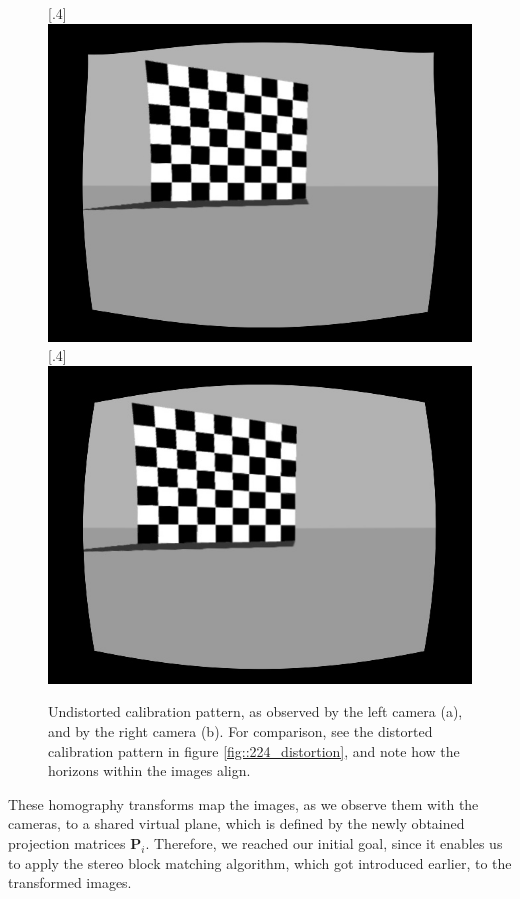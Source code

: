 \begin{figure}[h!]
	\centering
	\captionbox{}%
	[.4\linewidth]{\includegraphics[scale=.2]{chapters/03_principles_of_machine_learning/img/gazebo_rectified_left.jpg}}
	\captionbox{}%
	[.4\linewidth]{\includegraphics[scale=.2]{chapters/03_principles_of_machine_learning/img/gazebo_rectified_right.jpg}}
	\caption{Undistorted calibration pattern, as observed by the left camera (a), and by the right camera (b). For comparison, see the distorted calibration pattern in figure \ref{fig::224_distortion}, and note how the horizons within the images align.}
	\label{fig::224_rectified}
\end{figure}
These homography transforms map the images, as we observe them with the cameras, to a shared virtual plane, which is defined by the newly obtained projection matrices $\bm{P}_i$. Therefore, we reached our initial goal, since it enables us to apply the stereo block matching algorithm, which got introduced earlier, to the transformed images.